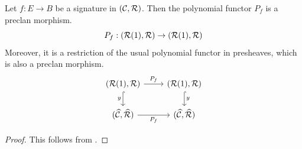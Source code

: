 \begin{proposition}\label{prop:polynomial-functor-preclan-morphism}
  Let $f : E \to B$ be a signature in $(\mathcal{C},\mathcal{R})$.
  Then the polynomial functor $P_f$ is a preclan morphism.
  \[ P_f : (\mathcal{R}(1), \mathcal{R}) \to (\mathcal{R}(1), \mathcal{R})\]
  Moreover, it is a restriction of the usual polynomial functor in presheaves,
  which is also a preclan morphism.
  \[ \begin{tikzcd}
      {(\RR(1), \RR)} & {(\RR(1), \RR)} \\
      {(\wCC, \wRR)} & {(\wCC, {\wRR})}
      \arrow["{P_f}", from=1-1, to=1-2]
      \arrow["y"', hook, from=1-1, to=2-1]
      \arrow["y", hook, from=1-2, to=2-2]
      \arrow["{P_f}"', from=2-1, to=2-2]
    \end{tikzcd} \]
\end{proposition}
\begin{proof}
  This follows from .
\end{proof}


